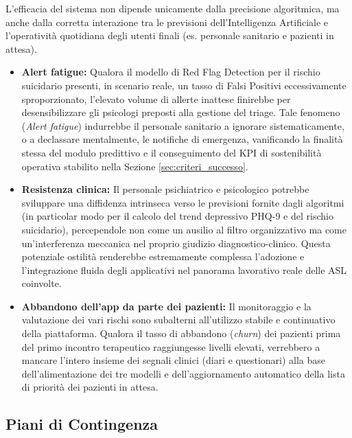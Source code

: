 L'efficacia del sistema non dipende unicamente dalla precisione algoritmica, ma anche dalla corretta interazione tra le previsioni dell'Intelligenza Artificiale e l'operatività quotidiana degli utenti finali (es. personale sanitario e pazienti in attesa).

\begin{itemize}
    \item \textbf{Alert fatigue:} Qualora il modello di Red Flag Detection per il rischio suicidario presenti, in scenario reale, un tasso di Falsi Positivi eccessivamente sproporzionato, l'elevato volume di allerte inattese finirebbe per desensibilizzare gli psicologi preposti alla gestione del triage. Tale fenomeno (\textit{Alert fatigue}) indurrebbe il personale sanitario a ignorare sistematicamente, o a declassare mentalmente, le notifiche di emergenza, vanificando la finalità stessa del modulo predittivo e il conseguimento del KPI di sostenibilità operativa stabilito nella Sezione \ref{sec:criteri_successo}.
    \item \textbf{Resistenza clinica:} Il personale psichiatrico e psicologico potrebbe sviluppare una diffidenza intrinseca verso le previsioni fornite dagli algoritmi (in particolar modo per il calcolo del trend depressivo PHQ-9 e del rischio suicidario), percependole non come un ausilio al filtro organizzativo ma come un'interferenza meccanica nel proprio giudizio diagnostico-clinico. Questa potenziale ostilità renderebbe estremamente complessa l'adozione e l'integrazione fluida degli applicativi nel panorama lavorativo reale delle ASL coinvolte.
    \item \textbf{Abbandono dell'app da parte dei pazienti:} Il monitoraggio e la valutazione dei vari rischi sono subalterni all'utilizzo stabile e continuativo della piattaforma. Qualora il tasso di abbandono (\textit{churn}) dei pazienti prima del primo incontro terapeutico raggiungesse livelli elevati, verrebbero a mancare l'intero insieme dei segnali clinici (diari e questionari) alla base dell'alimentazione dei tre modelli e dell'aggiornamento automatico della lista di priorità dei pazienti in attesa.
\end{itemize}




\subsection*{Piani di Contingenza}

